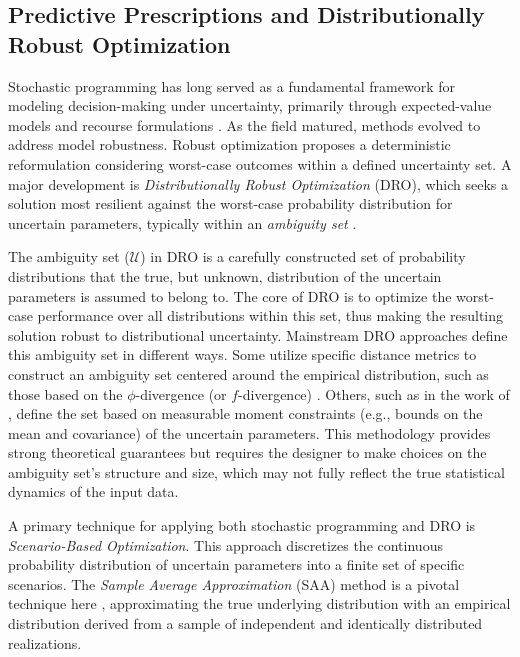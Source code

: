 \documentclass[ijoc,sglanonrev]{informs4}
\begin{document}
\subsection{Predictive Prescriptions and Distributionally Robust Optimization}

Stochastic programming has long served as a fundamental framework for modeling decision-making under uncertainty, primarily through expected-value models and recourse formulations \citep{D55,B55}. As the field matured, methods evolved to address model robustness. Robust optimization \citep{BS04} proposes a deterministic reformulation considering worst-case outcomes within a defined uncertainty set. A major development is {\it Distributionally Robust Optimization} (DRO), which seeks a solution most resilient against the worst-case probability distribution for uncertain parameters, typically within an {\it ambiguity set} \citep{DY10}.

The ambiguity set ($\mathcal{U}$) in DRO is a carefully constructed set of probability distributions that the true, but unknown, distribution of the uncertain parameters is assumed to belong to. The core of DRO is to optimize the worst-case performance over all distributions within this set, thus making the resulting solution robust to distributional uncertainty. Mainstream DRO approaches define this ambiguity set in different ways. Some utilize specific distance metrics to construct an ambiguity set centered around the empirical distribution, such as those based on the $\phi$-divergence (or $f$-divergence) \citep{BK19}. Others, such as in the work of \citet{EK17}, define the set based on measurable moment constraints (e.g., bounds on the mean and covariance) of the uncertain parameters. This methodology provides strong theoretical guarantees but requires the designer to make choices on the ambiguity set's structure and size, which may not fully reflect the true statistical dynamics of the input data.

A primary technique for applying both stochastic programming and DRO is {\it Scenario-Based Optimization}. This approach discretizes the continuous probability distribution of uncertain parameters into a finite set of specific scenarios. The {\it Sample Average Approximation} (SAA) method is a pivotal technique here \citep{SH98}, approximating the true underlying distribution with an empirical distribution derived from a sample of independent and identically distributed realizations.
\end{document}
